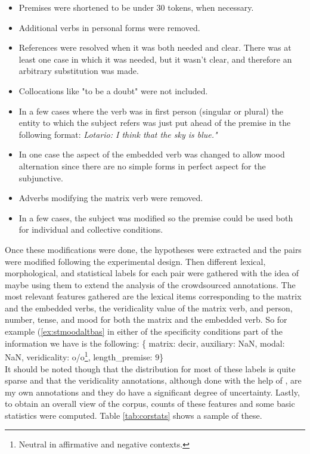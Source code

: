     \begin{itemize}
    \item Premises were shortened to be under 30 tokens, when necessary.
    \item Additional verbs in personal forms were removed.
    \item References were resolved when it was both needed and clear. There was at least one case in which it was needed, but it wasn't clear, and therefore an arbitrary substitution was made.
    \item Collocations like "to be a doubt" were not included.
    \item In a few cases where the verb was in first person (singular or plural) the entity to which the subject refers was just put ahead of the premise in the following format: \textit{Lotario: I think that the sky is blue."}
    \item In one case the aspect of the embedded verb was changed to allow mood alternation since there are no simple forms in perfect aspect for the subjunctive.
    \item Adverbs modifying the matrix verb were removed.
    \item In a few cases, the subject was modified so the premise could be used both for individual and collective conditions.
  \end{itemize}

Once these modifications were done, the hypotheses were extracted and the pairs were modified following the experimental design. Then different lexical, morphological, and statistical labels for each pair were gathered with the idea of maybe using them to extend the analysis of the crowdsourced annotations. The most relevant features gathered are the lexical items corresponding to the matrix and the embedded verbs, the veridicality value of the matrix verb, and person, number, tense, and mood for both the matrix and the embedded verb. So for example (\ref{ex:stmoodaltbas} in either of the specificity conditions part of the information we have is the following: \{ matrix: decir, auxiliary: NaN, modal: NaN, veridicality: o/o\footnote{Neutral in affirmative and negative contexts.}, length\_premise: $9$\}\\

It should be noted though that the distribution for most of these labels is quite sparse and that the veridicality annotations, although done with the help of \citet{stanlex2012}, are my own annotations and they do have a significant degree of uncertainty. Lastly, to obtain an overall view of the corpus, counts of these features and some basic statistics were computed. Table \ref{tab:corstats} shows a sample of these.\\

